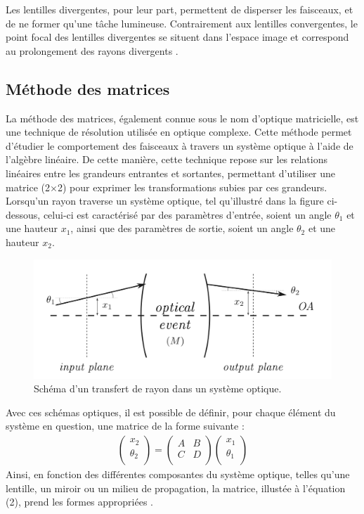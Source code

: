 \documentclass[11pt,letterpaper]{article}
\begin{document}
Les lentilles divergentes, pour leur part, permettent de disperser les faisceaux, et de ne former qu'une tâche lumineuse. Contrairement aux lentilles convergentes, le point focal des lentilles divergentes se situent dans l'espace image et correspond au prolongement des rayons divergents \cite{zimmermann_lentilles_2015}. 

\subsection{Méthode des matrices}
La méthode des matrices, également connue sous le nom d'optique matricielle, est une technique de résolution utilisée en optique complexe. Cette méthode permet d'étudier le comportement des faisceaux à travers un système optique à l'aide de l'algèbre linéaire. De cette manière, cette technique repose sur les relations linéaires entre les grandeurs entrantes et sortantes, permettant d'utiliser une matrice (2$\times$2) pour exprimer les transformations subies par ces grandeurs. Lorsqu'un rayon traverse un système optique, tel qu'illustré dans la figure ci-dessous, celui-ci est caractérisé par des paramètres d'entrée, soient un angle $\theta_1$ et une hauteur $x_1$, ainsi que des paramètres de sortie, soient un angle $\theta_2$ et une hauteur $x_2$.
\begin{figure}[H]
  \centering
  \includegraphics[scale=0.5]{methode_math.png}
  \caption{Schéma d'un transfert de rayon dans un système optique.}
  \label{methode_math}
\end{figure}
Avec ces schémas optiques, il est possible de définir, pour chaque élément du système en question, une matrice de la forme suivante :
\begin{gather}
  \begin{pmatrix}
    x_2 \\
    \theta_2 \\
  \end{pmatrix}=
  \begin{pmatrix}
    A & B \\
    C & D \\
  \end{pmatrix}
  \begin{pmatrix}
    x_1 \\
    \theta_1 \\
  \end{pmatrix}
\end{gather}
Ainsi, en fonction des différentes composantes du système optique, telles qu'une lentille, un miroir ou un milieu de propagation, la matrice, illustée à l'équation (2), prend les formes appropriées \cite{leblond_semaine_2024-1}.
\end{document}
